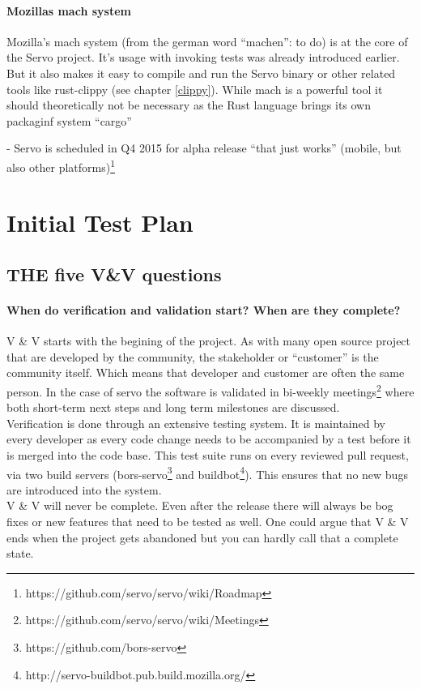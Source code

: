 \documentclass{scrartcl}
\begin{document}
\paragraph{Mozillas mach system}
Mozilla's mach system (from the german word ``machen'': to do) is at the core of the Servo project. It's usage with invoking tests was already introduced earlier. But it also makes it easy to compile and run the Servo binary or other related tools like rust-clippy (see chapter \ref{clippy}). While mach is a powerful tool it should theoretically not be necessary as the Rust language brings its own packaginf system ``cargo''


- Servo is scheduled in Q4 2015 for alpha release ``that just works'' (mobile, but also other platforms)\footnote{https://github.com/servo/servo/wiki/Roadmap}


\section{Initial Test Plan}
\subsection{THE five V\&V questions}
\paragraph{When do verification and validation start? When are they complete?}
V \& V starts with the begining of the project. As with many open source project that are developed by the community, the stakeholder or ``customer'' is the community itself. Which means that developer and customer are often the same person. In the case of servo the software is validated in bi-weekly meetings\footnote{https://github.com/servo/servo/wiki/Meetings} where both short-term next steps and long term milestones are discussed.\\
  
  Verification is done through an extensive testing system. It is maintained by every developer as every code change needs to be accompanied by a test before it is merged into the code base. This test suite runs on every reviewed pull request, via two build servers (bors-servo\footnote{https://github.com/bors-servo} and buildbot\footnote{http://servo-buildbot.pub.build.mozilla.org/}). This ensures that no new bugs are introduced into the system.\\
  
V \& V will never be complete. Even after the release there will always be bog fixes or new features that need to be tested as well. One could argue that V \& V ends when the project gets abandoned but you can hardly call that a complete state.
\end{document}
